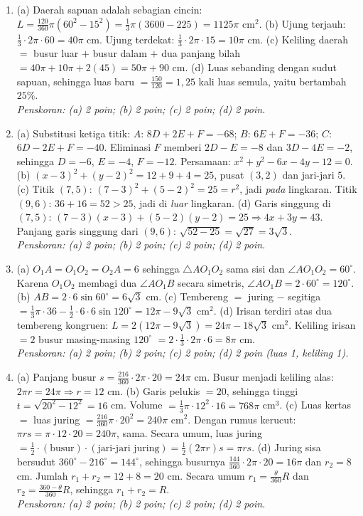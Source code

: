 \documentclass[a4paper,11pt]{article}
\begin{document}
\small\begin{enumerate}[leftmargin=2em,itemsep=3pt,topsep=2pt]
\item[\textbf{1.}] (a) Daerah sapuan adalah sebagian cincin: $L=\frac{120}{360}\pi(60^2-15^2)=\frac13\pi(3600-225)=1125\pi$ cm$^2$. (b) Ujung terjauh: $\frac13\cdot2\pi\cdot60=40\pi$ cm. Ujung terdekat: $\frac13\cdot2\pi\cdot15=10\pi$ cm. (c) Keliling daerah $=$ busur luar $+$ busur dalam $+$ dua panjang bilah $=40\pi+10\pi+2(45)=50\pi+90$ cm. (d) Luas sebanding dengan sudut sapuan, sehingga luas baru $=\frac{150}{120}=1{,}25$ kali luas semula, yaitu bertambah $25\%$. \\ \textit{Penskoran: (a) 2 poin; (b) 2 poin; (c) 2 poin; (d) 2 poin.}
\item[\textbf{2.}] (a) Substitusi ketiga titik: $A$: $8D+2E+F=-68$; $B$: $6E+F=-36$; $C$: $6D-2E+F=-40$. Eliminasi $F$ memberi $2D-E=-8$ dan $3D-4E=-2$, sehingga $D=-6$, $E=-4$, $F=-12$. Persamaan: $x^2+y^2-6x-4y-12=0$. (b) $(x-3)^2+(y-2)^2=12+9+4=25$, pusat $(3,2)$ dan jari-jari $5$. (c) Titik $(7,5)$: $(7-3)^2+(5-2)^2=25=r^2$, jadi \emph{pada} lingkaran. Titik $(9,6)$: $36+16=52>25$, jadi di \emph{luar} lingkaran. (d) Garis singgung di $(7,5)$: $(7-3)(x-3)+(5-2)(y-2)=25\Rightarrow4x+3y=43$. Panjang garis singgung dari $(9,6)$: $\sqrt{52-25}=\sqrt{27}=3\sqrt3$. \\ \textit{Penskoran: (a) 2 poin; (b) 2 poin; (c) 2 poin; (d) 2 poin.}
\item[\textbf{3.}] (a) $O_1A=O_1O_2=O_2A=6$ sehingga $\triangle AO_1O_2$ sama sisi dan $\angle AO_1O_2=60^\circ$. Karena $O_1O_2$ membagi dua $\angle AO_1B$ secara simetris, $\angle AO_1B=2\cdot60^\circ=120^\circ$. (b) $AB=2\cdot6\sin60^\circ=6\sqrt3$ cm. (c) Tembereng $=$ juring $-$ segitiga $=\frac13\pi\cdot36-\frac12\cdot6\cdot6\sin120^\circ=12\pi-9\sqrt3$ cm$^2$. (d) Irisan terdiri atas dua tembereng kongruen: $L=2(12\pi-9\sqrt3)=24\pi-18\sqrt3$ cm$^2$. Keliling irisan $=2$ busur masing-masing $120^\circ$ $=2\cdot\frac13\cdot2\pi\cdot6=8\pi$ cm. \\ \textit{Penskoran: (a) 2 poin; (b) 2 poin; (c) 2 poin; (d) 2 poin (luas 1, keliling 1).}
\item[\textbf{4.}] (a) Panjang busur $s=\frac{216}{360}\cdot2\pi\cdot20=24\pi$ cm. Busur menjadi keliling alas: $2\pi r=24\pi\Rightarrow r=12$ cm. (b) Garis pelukis $=20$, sehingga tinggi $t=\sqrt{20^2-12^2}=16$ cm. Volume $=\frac13\pi\cdot12^2\cdot16=768\pi$ cm$^3$. (c) Luas kertas $=$ luas juring $=\frac{216}{360}\pi\cdot20^2=240\pi$ cm$^2$. Dengan rumus kerucut: $\pi rs=\pi\cdot12\cdot20=240\pi$, sama. Secara umum, luas juring $=\frac12\cdot(\text{busur})\cdot(\text{jari-jari juring})=\frac12(2\pi r)s=\pi rs$. (d) Juring sisa bersudut $360^\circ-216^\circ=144^\circ$, sehingga busurnya $\frac{144}{360}\cdot2\pi\cdot20=16\pi$ dan $r_2=8$ cm. Jumlah $r_1+r_2=12+8=20$ cm. Secara umum $r_1=\frac{\theta}{360}R$ dan $r_2=\frac{360-\theta}{360}R$, sehingga $r_1+r_2=R$. \\ \textit{Penskoran: (a) 2 poin; (b) 2 poin; (c) 2 poin; (d) 2 poin.}

\end{enumerate}
\end{document}
